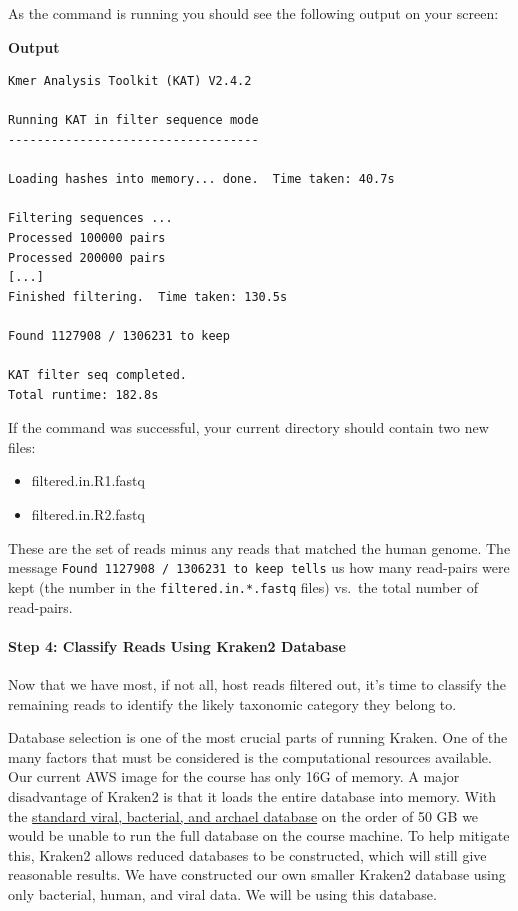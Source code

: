 \documentclass[
]{book}
\providecommand{\tightlist}{%
  \setlength{\itemsep}{0pt}\setlength{\parskip}{0pt}}
\begin{document}
As the command is running you should see the following output on your screen:

\textbf{Output}

\begin{verbatim}
Kmer Analysis Toolkit (KAT) V2.4.2

Running KAT in filter sequence mode
-----------------------------------

Loading hashes into memory... done.  Time taken: 40.7s

Filtering sequences ...
Processed 100000 pairs
Processed 200000 pairs
[...]
Finished filtering.  Time taken: 130.5s

Found 1127908 / 1306231 to keep

KAT filter seq completed.
Total runtime: 182.8s
\end{verbatim}

If the command was successful, your current directory should contain two new files:

\begin{itemize}
\tightlist
\item
  filtered.in.R1.fastq
\item
  filtered.in.R2.fastq
\end{itemize}

These are the set of reads minus any reads that matched the human genome. The message \texttt{Found\ 1127908\ /\ 1306231\ to\ keep\ tells} us how many read-pairs were kept (the number in the \texttt{filtered.in.*.fastq} files) vs.~the total number of read-pairs.

\paragraph{Step 4: Classify Reads Using Kraken2 Database}\label{step-4-classify-reads-using-kraken2-database}

Now that we have most, if not all, host reads filtered out, it's time to classify the remaining reads to identify the likely taxonomic category they belong to.

Database selection is one of the most crucial parts of running Kraken. One of the many factors that must be considered is the computational resources available. Our current AWS image for the course has only 16G of memory. A major disadvantage of Kraken2 is that it loads the entire database into memory. With the \href{https://benlangmead.github.io/aws-indexes/k2}{standard viral, bacterial, and archael database} on the order of 50 GB we would be unable to run the full database on the course machine. To help mitigate this, Kraken2 allows reduced databases to be constructed, which will still give reasonable results. We have constructed our own smaller Kraken2 database using only bacterial, human, and viral data. We will be using this database.
\end{document}
